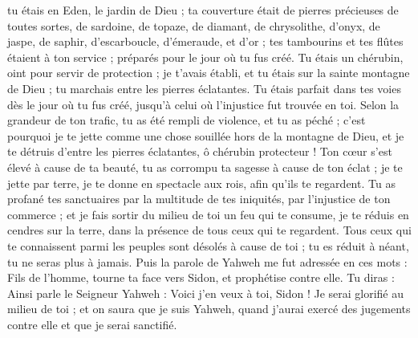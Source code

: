 \begin{multicols}{2}
tu étais en Eden, le jardin de Dieu ; ta couverture était de pierres précieuses de toutes sortes, de sardoine, de topaze, de diamant, de chrysolithe, d'onyx, de jaspe, de saphir, d'escarboucle, d'émeraude, et d'or ; tes tambourins et tes flûtes étaient à ton service ; préparés pour le jour où tu fus créé.
Tu étais un chérubin, oint pour servir de protection ; je t'avais établi, et tu étais sur la sainte montagne de Dieu ; tu marchais entre les pierres éclatantes.
Tu étais parfait dans tes voies dès le jour où tu fus créé, jusqu'à celui où l'injustice fut trouvée en toi.
Selon la grandeur de ton trafic, tu as été rempli de violence, et tu as péché ; c'est pourquoi je te jette comme une chose souillée hors de la montagne de Dieu, et je te détruis d'entre les pierres éclatantes, ô chérubin protecteur !
Ton cœur s'est élevé à cause de ta beauté, tu as corrompu ta sagesse à cause de ton éclat ; je te jette par terre, je te donne en spectacle aux rois, afin qu'ils te regardent.
Tu as profané tes sanctuaires par la multitude de tes iniquités, par l'injustice de ton commerce ; et je fais sortir du milieu de toi un feu qui te consume, je te réduis en cendres sur la terre, dans la présence de tous ceux qui te regardent.
Tous ceux qui te connaissent parmi les peuples sont désolés à cause de toi ; tu es réduit à néant, tu ne seras plus à jamais.
Puis la parole de Yahweh me fut adressée en ces mots :
Fils de l'homme, tourne ta face vers Sidon, et prophétise contre elle.
Tu diras : Ainsi parle le Seigneur Yahweh : Voici j'en veux à toi, Sidon ! Je serai glorifié au milieu de toi ; et on saura que je suis Yahweh, quand j'aurai exercé des jugements contre elle et que je serai sanctifié.

\end{multicols}
